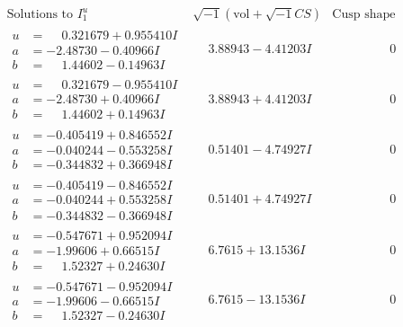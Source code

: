 \documentclass[1p]{elsarticle_modified}
\theoremstyle{definition}
\newcommand{\I}{\sqrt{-1}}
\begin{document}
$$\begin{array}{c|c|c}  
\text{Solutions to }I^u_{1}& \I (\text{vol} + \sqrt{-1}CS) & \text{Cusp shape}\\
 \hline 
\begin{aligned}
u &= \phantom{-}0.321679 + 0.955410 I \\
a &= -2.48730 - 0.40966 I \\
b &= \phantom{-}1.44602 - 0.14963 I\end{aligned}
 & \phantom{-}3.88943 - 4.41203 I & \phantom{-0.000000 } 0 \\ \hline\begin{aligned}
u &= \phantom{-}0.321679 - 0.955410 I \\
a &= -2.48730 + 0.40966 I \\
b &= \phantom{-}1.44602 + 0.14963 I\end{aligned}
 & \phantom{-}3.88943 + 4.41203 I & \phantom{-0.000000 } 0 \\ \hline\begin{aligned}
u &= -0.405419 + 0.846552 I \\
a &= -0.040244 - 0.553258 I \\
b &= -0.344832 + 0.366948 I\end{aligned}
 & \phantom{-}0.51401 - 4.74927 I & \phantom{-0.000000 } 0 \\ \hline\begin{aligned}
u &= -0.405419 - 0.846552 I \\
a &= -0.040244 + 0.553258 I \\
b &= -0.344832 - 0.366948 I\end{aligned}
 & \phantom{-}0.51401 + 4.74927 I & \phantom{-0.000000 } 0 \\ \hline\begin{aligned}
u &= -0.547671 + 0.952094 I \\
a &= -1.99606 + 0.66515 I \\
b &= \phantom{-}1.52327 + 0.24630 I\end{aligned}
 & \phantom{-}6.7615 + 13.1536 I & \phantom{-0.000000 } 0 \\ \hline\begin{aligned}
u &= -0.547671 - 0.952094 I \\
a &= -1.99606 - 0.66515 I \\
b &= \phantom{-}1.52327 - 0.24630 I\end{aligned}
 & \phantom{-}6.7615 - 13.1536 I & \phantom{-0.000000 } 0 \\ \hline\begin{aligned}

\end{aligned}
\end{array}$$
\end{document}
